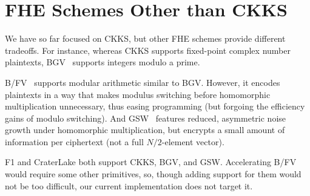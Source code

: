 \section{FHE Schemes Other than CKKS}
\label{sec:fhe_others}

We have so far focused on CKKS, but other FHE schemes provide different
tradeoffs. For instance, whereas CKKS supports fixed-point complex number
plaintexts, BGV~\cite{brakerski:toct14:leveled} supports integers modulo a prime.

B/FV~\cite{brakerski:crypto12:fully,fan:iacr12:somewhat} supports modular
arithmetic similar to BGV. However, it encodes plaintexts in a way that makes
modulus switching before homomorphic multiplication unnecessary, thus easing
programming (but forgoing the efficiency gains of modulo switching). And
GSW~\cite{gentry:crypto13:homomorphic} features reduced, asymmetric noise
growth under homomorphic multiplication, but encrypts a small amount of
information per ciphertext (not a full $N/2$-element vector).

F1 and CraterLake both support CKKS, BGV, and GSW. Accelerating B/FV would
require some other primitives, so, though adding support for them would not be
too difficult, our current implementation does not target it.
